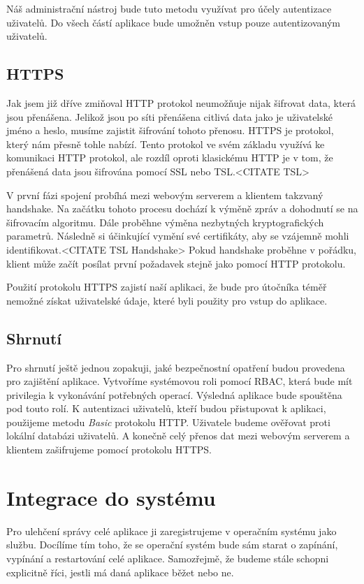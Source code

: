     Náš administrační nástroj bude tuto metodu využívat pro účely autentizace uživatelů. Do všech částí aplikace bude umožněn vstup pouze autentizovaným uživatelů.

    \subsection{HTTPS}
    \label{https}
    Jak jsem již dříve zmiňoval HTTP protokol neumožňuje nijak šifrovat data, která jsou přenášena. Jelikož jsou po síti přenášena citlivá data jako je uživatelské jméno a heslo, musíme zajistit šifrování tohoto přenosu. HTTPS je protokol, který nám přesně tohle nabízí. Tento protokol ve svém základu využívá ke komunikaci HTTP protokol, ale rozdíl oproti klasickému HTTP je v tom, že přenášená data jsou šifrována pomocí SSL nebo TSL.<CITATE TSL>

    V první fázi spojení probíhá mezi webovým serverem a klientem takzvaný handshake. Na začátku tohoto procesu dochází k výměně zpráv a dohodnutí se na šifrovacím algoritmu. Dále proběhne výměna nezbytných kryptografických parametrů. Následně si účinkující vymění své certifikáty, aby se vzájemně mohli identifikovat.<CITATE TSL Handshake> Pokud handshake proběhne v pořádku, klient může začít posílat první požadavek stejně jako pomocí HTTP protokolu.

    Použití protokolu HTTPS zajistí naší aplikaci, že bude pro útočníka téměř nemožné získat uživatelské údaje, které byli použity pro vstup do aplikace.
    \subsection{Shrnutí}
    Pro shrnutí ještě jednou zopakuji, jaké bezpečnostní opatření budou provedena pro zajištění aplikace. Vytvoříme systémovou roli pomocí RBAC, která bude mít privilegia k vykonávání potřebných operací. Výsledná aplikace bude spouštěna pod touto rolí. K autentizaci uživatelů, kteří budou přistupovat k aplikaci, použijeme metodu \emph{Basic} protokolu HTTP. Uživatele budeme ověřovat proti lokální databázi uživatelů. A konečně celý přenos dat mezi webovým serverem a klientem zašifrujeme pomocí protokolu HTTPS.

\section{Integrace do systému}
Pro ulehčení správy celé aplikace ji zaregistrujeme v operačním systému jako službu. Docílíme tím toho, že se operační systém bude sám starat o zapínání, vypínání a restartování celé aplikace. Samozřejmě, že budeme stále schopni explicitně říci, jestli má daná aplikace běžet nebo ne.

